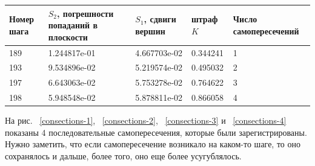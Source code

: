 \documentclass[a4paper,12pt, titlepage]{article}
\begin{document}
\begin{flushleft}
 \begin{tabular}{|p{1cm}|p{3cm}|p{3cm}|p{3cm}|p{3cm}|}
  \hline
  Номер шага & $S_{2}$, погрешности попаданий в плоскости & $S_{1}$, сдвиги вершин& штраф $K$ & 
  Число самопересечений\\
  \hline
  189 & 1.244817e-01 & 4.667703e-02 & 0.344241 & 1\\
  \hline
  193 & 9.534896e-02 & 5.219574e-02 & 0.495032 & 2\\
  \hline
  197 & 6.643063e-02 & 5.753278e-02 & 0.764622 & 3\\
  \hline
  198 & 5.948548e-02 & 5.878811e-02 & 0.866058 & 4\\
  \hline
 \end{tabular}
\end{flushleft}

\begin{flushleft}
 На рис. ~\ref{consections-1}, ~\ref{consections-2}, ~\ref{consections-3} и ~\ref{consections-4} 
показаны 4 последовательные самопересечения, которые были зарегистрированы. Нужно заметить, что
если самопересечение возникало на каком-то шаге, то оно сохранялось и дальше, более того, оно 
еще более усугублялось.
\end{flushleft}
\end{document}
